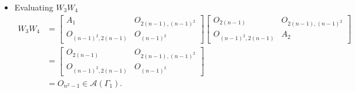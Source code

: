 \begin{itemize}
    \item Evaluating $W_3W_4$
    \begin{align*}
        W_3W_4
        &=
        \begin{bmatrix}
            A_1 & O_{2(n-1), (n-1)^2} \\
            O_{(n-1)^2, 2(n-1)} & O_{(n-1)^2}
        \end{bmatrix}\begin{bmatrix}
            O_{2(n-1)} & O_{2(n-1), (n-1)^2} \\
            O_{(n-1)^2, 2(n-1)} & A_2
        \end{bmatrix} \\
        &= \begin{bmatrix}
            O_{2(n-1)} & O_{2(n-1), (n-1)^2} \\
            O_{(n-1)^2, 2(n-1)} & O_{(n-1)^2}
        \end{bmatrix} \\
        &= O_{n^2-1} \in \mathcal{A}(\Gamma_1).
    \end{align*}
    

\end{itemize}
